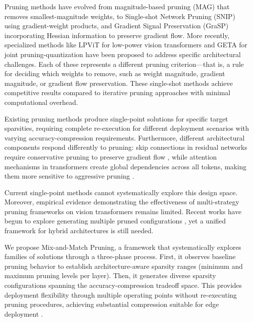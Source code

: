 \documentclass[11pt, conference]{IEEEtran}
\begin{document}
Pruning methods have evolved from magnitude-based pruning (MAG) \cite{han2015learning} that removes smallest-magnitude weights, to Single-shot Network Pruning (SNIP) \cite{lee2018snip} using gradient-weight products, and Gradient Signal Preservation (GraSP) \cite{wang2020picking} incorporating Hessian information to preserve gradient flow. More recently, specialized methods like LPViT \cite{wu2025lpvit} for low-power vision transformers and GETA \cite{geta2025} for joint pruning-quantization have been proposed to address specific architectural challenges. Each of these represents a different pruning criterion—that is, a rule for deciding which weights to remove, such as weight magnitude, gradient magnitude, or gradient flow preservation. These single-shot methods achieve competitive results compared to iterative pruning approaches with minimal computational overhead.

Existing pruning methods produce single-point solutions for specific target sparsities, requiring complete re-execution for different deployment scenarios with varying accuracy-compression requirements. Furthermore, different architectural components respond differently to pruning: skip connections in residual networks require conservative pruning to preserve gradient flow \cite{li2017pruning}, while attention mechanisms in transformers create global dependencies across all tokens, making them more sensitive to aggressive pruning \cite{rao2021dynamicvit}.

Current single-point methods cannot systematically explore this design space. Moreover, empirical evidence demonstrating the effectiveness of multi-strategy pruning frameworks on vision transformers remains limited. Recent works have begun to explore generating multiple pruned configurations \cite{lee2024mpruner, desai2024llamaflex}, yet a unified framework for hybrid architectures is still needed.

We propose Mix-and-Match Pruning, a framework that systematically explores families of solutions through a three-phase process. First, it observes baseline pruning behavior to establish architecture-aware sparsity ranges (minimum and maximum pruning levels per layer). Then, it generates diverse sparsity configurations spanning the accuracy-compression tradeoff space. This provides deployment flexibility through multiple operating points without re-executing pruning procedures, achieving substantial compression suitable for edge deployment \cite{wu2025lpvit}.
\end{document}
